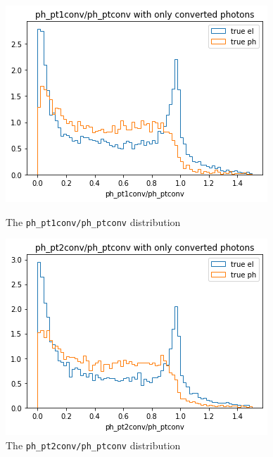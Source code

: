 \documentclass[a4paper, oneside]{book}
\begin{document}
		\begin{figure}[H]  
			\begin{minipage}[b]{0.5\linewidth}
				\centering
				\includegraphics[width=.9\linewidth]{tesi_images/pt1_pt.png} 
				\caption{The \texttt{ph\_pt1conv/ph\_ptconv} distribution} 
				\label{fig: pt1/pt}
				\vspace{4ex}
			\end{minipage}%
			\begin{minipage}[b]{0.5\linewidth}
				\centering
				\includegraphics[width=.9\linewidth]{tesi_images/pt2_pt.png} 
				\caption{The \texttt{ph\_pt2conv/ph\_ptconv} distribution}
				\label{fig: pt2/pt} 
				\vspace{4ex}
			\end{minipage} 
			\begin{minipage}[b]{0.5\linewidth}
				\centering

\end{minipage}
\end{figure}
\end{document}
